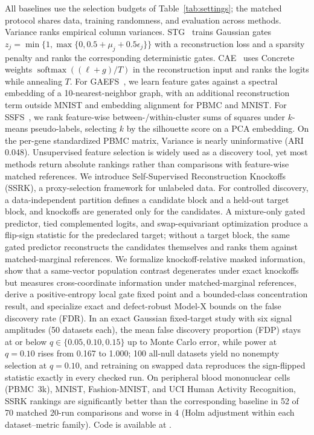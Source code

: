 All baselines use the selection budgets of Table~\ref{tab:settings}; the matched protocol shares data, training randomness, and evaluation across methods. Variance ranks empirical column variances. STG~\cite{yamadaFeatureSelectionUsing2020} trains Gaussian gates $z_j=\min\{1,\max\{0,0.5+\mu_j+0.5\epsilon_j\}\}$ with a reconstruction loss and a sparsity penalty and ranks the corresponding deterministic gates. CAE~\cite{balinConcreteAutoencodersDifferentiable2019} uses Concrete weights $\operatorname{softmax}((\ell+g)/T)$ in the reconstruction input and ranks the logits while annealing $T$. For GAEFS~\cite{tanGAEFSSelfsupervisedGraph2024}, we learn feature gates against a spectral embedding of a 10-nearest-neighbor graph, with an additional reconstruction term outside MNIST and embedding alignment for PBMC and MNIST. For SSFS~\cite{segalSpectralSelfsupervisedFeature2024}, we rank feature-wise between-/within-cluster sums of squares under $k$-means pseudo-labels, selecting $k$ by the silhouette score on a PCA embedding. On the per-gene standardized PBMC matrix, Variance is nearly uninformative (ARI 0.048).
Unsupervised feature selection is widely used as a discovery tool, yet most methods return absolute rankings rather than comparisons with feature-wise matched references. We introduce Self-Supervised Reconstruction Knockoffs (SSRK), a proxy-selection framework for unlabeled data. For controlled discovery, a data-independent partition defines a candidate block and a held-out target block, and knockoffs are generated only for the candidates. A mixture-only gated predictor, tied complemented logits, and swap-equivariant optimization produce a flip-sign statistic for the predeclared target; without a target block, the same gated predictor reconstructs the candidates themselves and ranks them against matched-marginal references. We formalize knockoff-relative masked information, show that a same-vector population contrast degenerates under exact knockoffs but measures cross-coordinate information under matched-marginal references, derive a positive-entropy local gate fixed point and a bounded-class concentration result, and specialize exact and defect-robust Model-X bounds on the false discovery rate (FDR). In an exact Gaussian fixed-target study with six signal amplitudes (50 datasets each), the mean false discovery proportion (FDP) stays at or below $q\in\{0.05,0.10,0.15\}$ up to Monte Carlo error, while power at $q=0.10$ rises from 0.167 to 1.000; 100 all-null datasets yield no nonempty selection at $q=0.10$, and retraining on swapped data reproduces the sign-flipped statistic exactly in every checked run. On peripheral blood mononuclear cells (PBMC~3k), MNIST, Fashion-MNIST, and UCI Human Activity Recognition, SSRK rankings are significantly better than the corresponding baseline in 52 of 70 matched 20-run comparisons and worse in 4 (Holm adjustment within each dataset--metric family). Code is available at \coderepo.
